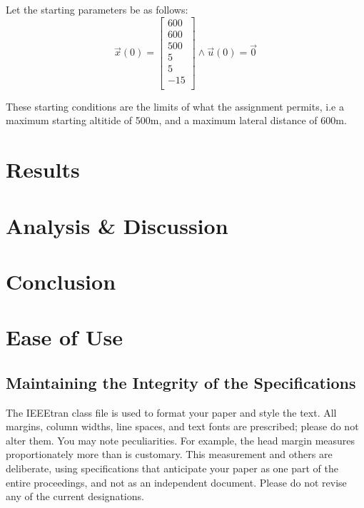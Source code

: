 \documentclass[conference, tikz]{IEEEtran}
\begin{document}
Let the starting parameters be as follows:
\[
    \vec x(0)
        =
        \begin{bmatrix}
            600\\
            600\\
            500\\
            5\\
            5\\
            -15\\
        \end{bmatrix}
        \land
        \vec u(0)
        = \vec 0
        
\]

These starting conditions are the limits of what the assignment permits, i.e a maximum starting altitide of 500m, and a maximum lateral distance of 600m.


\section{Results}

\section{Analysis \& Discussion}

\section{Conclusion}


\newpage



\section{Ease of Use}

\subsection{Maintaining the Integrity of the Specifications}

The IEEEtran class file is used to format your paper and style the text. All margins, 
column widths, line spaces, and text fonts are prescribed; please do not 
alter them. You may note peculiarities. For example, the head margin
measures proportionately more than is customary. This measurement 
and others are deliberate, using specifications that anticipate your paper 
as one part of the entire proceedings, and not as an independent document. 
Please do not revise any of the current designations.
\end{document}
